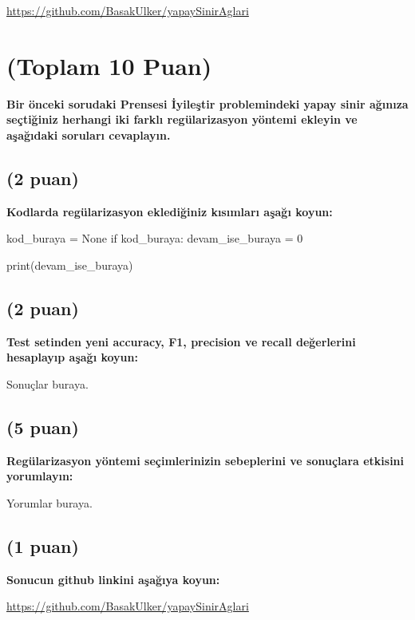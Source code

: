 \documentclass[11pt]{article}
\begin{document}
\url{https://github.com/BasakUlker/yapaySinirAglari}

\section{(Toplam 10 Puan)} \textbf{Bir önceki sorudaki Prensesi İyileştir problemindeki yapay sinir ağınıza seçtiğiniz herhangi iki farklı regülarizasyon yöntemi ekleyin ve aşağıdaki soruları cevaplayın.} 

\subsection{(2 puan)} \textbf{Kodlarda regülarizasyon eklediğiniz kısımları aşağı koyun:} 

\begin{python}
kod_buraya = None
if kod_buraya:
    devam_ise_buraya = 0

print(devam_ise_buraya)
\end{python}

\subsection{(2 puan)} \textbf{Test setinden yeni accuracy, F1, precision ve recall değerlerini hesaplayıp aşağı koyun:}

Sonuçlar buraya.

\subsection{(5 puan)} \textbf{Regülarizasyon yöntemi seçimlerinizin sebeplerini ve sonuçlara etkisini yorumlayın:}

Yorumlar buraya.

\subsection{(1 puan)} \textbf{Sonucun github linkini  aşağıya koyun:}

\url{https://github.com/BasakUlker/yapaySinirAglari}
\end{document}
